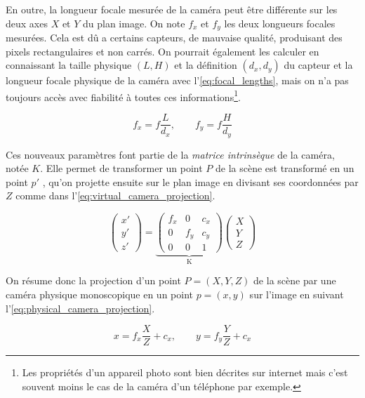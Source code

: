 En outre, la longueur focale mesurée de la caméra peut être différente sur les deux axes $X$ et $Y$ du plan image. On note $f_x$ et $f_y$ les deux longueurs focales mesurées. Cela est dû a certains capteurs, de mauvaise qualité, produisant des pixels rectangulaires et non carrés. On pourrait également les calculer en connaissant la taille physique $(L,H)$ et la définition $(d_x,d_y)$ du capteur et la longueur focale physique de la caméra avec l'\autoref{eq:focal_lengths}, mais on n'a pas toujours accès avec fiabilité à toutes ces informations\footnote{Les propriétés d'un appareil photo sont bien décrites sur internet mais c'est souvent moins le cas de la caméra d'un téléphone par exemple.}.

\begin{equation}
  \label{eq:focal_lengths}
  f_x = f \frac{L}{d_x},\qquad f_y = f \frac{H}{d_y}
\end{equation}

Ces nouveaux paramètres font partie de la \emph{matrice intrinsèque} de la caméra, notée $K$. Elle permet de transformer un point $P$ de la scène est transformé en un point $p'$ , qu'on projette ensuite sur le plan image en divisant ses coordonnées par $Z$ comme dans l'\autoref{eq:virtual_camera_projection}.

\begin{equation}
  \label{eq:projection}
  \begin{pmatrix}
    x'\\
    y'\\
    z'
  \end{pmatrix}
  =
  \underbrace{
    \begin{pmatrix}
      f_x & 0 & c_x\\
      0 & f_y & c_y\\
      0 & 0 & 1
    \end{pmatrix}
  }_\text{K}
  \begin{pmatrix}
    X\\
    Y\\
    Z
  \end{pmatrix}
\end{equation}

On résume donc la projection d'un point $P=(X,Y,Z)$ de la scène par une caméra physique monoscopique en un point $p=(x,y)$ sur l'image en suivant l'\autoref{eq:physical_camera_projection}.

\begin{equation}
  \label{eq:physical_camera_projection}
  x = f_x \frac{X}{Z} + c_x,\qquad y = f_y \frac{Y}{Z} + c_x
\end{equation}

